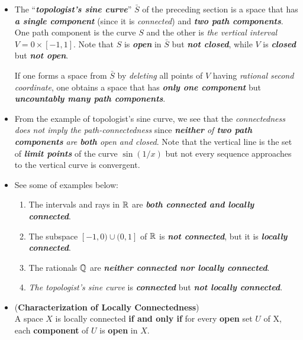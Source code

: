 \documentclass[11pt]{article}
\begin{document}
\begin{itemize}
\item \begin{example}
The ``\emph{\textbf{topologist’s sine curve}}” $\bar{S}$ of the preceding section is a space that has \emph{\textbf{a single component}} (since it is \emph{connected}) and \emph{\textbf{two path components}}. One path component is the curve $S$ and the other is \emph{the vertical interval} $V = 0 \times [-1, 1]$. Note that $S$ is \emph{\textbf{open}} in $\bar{S}$ but \emph{\textbf{not closed}}, while $V$ is \emph{\textbf{closed}} but \emph{\textbf{not open}}.

If one forms a space from $\bar{S}$ by \emph{deleting} all points of $V$ having \emph{rational second coordinate}, one obtains a space that has \emph{\textbf{only one component}} but \emph{\textbf{uncountably many path components}}.
\end{example}

\item \begin{remark}
From the example of topologist's sine curve, we see that the \emph{connectedness does not imply the path-connectedness} since \emph{\textbf{neither} of \textbf{two path components} are \textbf{both} open and closed}. Note that the vertical line is the set of \emph{\textbf{limit points}} of the  curve $\sin(1/x)$ but not every sequence approaches to the vertical curve is convergent. 
\end{remark}

\item \begin{example}
See some of examples below:
\begin{enumerate}
\item The intervals and rays in ${\mathbb R}$ are \emph{\textbf{both connected and locally connected}}.
\item The subspace $[−1, 0) \cup (0, 1]$ of ${\mathbb R}$ is \emph{\textbf{not connected}}, but it is \emph{\textbf{locally connected}}.
\item The rationals ${\mathbb Q}$ are \emph{\textbf{neither connected nor locally connected}}.
\item \emph{The topologist’s sine curve} is \emph{\textbf{connected}} but \emph{\textbf{not locally connected}}.
\end{enumerate} 
\end{example}


\item \begin{proposition} (\textbf{Characterization of Locally Connectedness}) \citep{munkres2000topology}\\
A space $X$ is locally connected \textbf{if and only if} for every \textbf{open} set $U$ of X, each \textbf{component} of $U$ is \textbf{open} in $X$.
\end{proposition}


\end{itemize}
\end{document}
